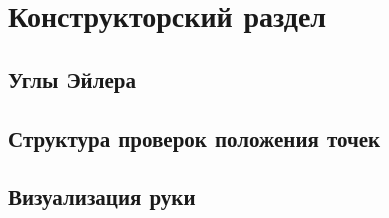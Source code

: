 \chapter{Конструкторский раздел}


\section{Углы Эйлера}


\section{Структура проверок положения точек}


\section{Визуализация руки}

